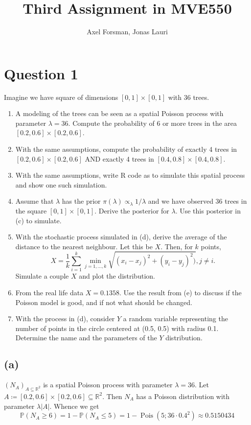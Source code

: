 \documentclass{article}
\title{Third Assignment in MVE550}
\author{Axel Forsman, Jonas Lauri}
\DeclareMathOperator\Poisson{Pois}
\begin{document}
\maketitle

\section{Question 1}
Imagine we have square of dimensions $[0,1] \times [0,1]$ with 36 trees.
\begin{enumerate}[label=(\alph*)]
	\item A modeling of the trees can be seen as a spatial Poisson process with parameter $\lambda = 36$. Compute the probability of 6 or more trees in the area $[0.2, 0.6] \times [0.2, 0.6]$.
	\item With the same assumptions, compute the probability of exactly 4 trees in $[0.2, 0.6] \times [0.2, 0.6]$ AND exactly 4 trees in $[0.4, 0.8] \times [0.4, 0.8]$.
	\item With the same assumptions, write R code as to simulate this spatial process and show one such simulation.
	\item Assume that $\lambda$ has the prior $\pi(\lambda) \propto_\lambda 1/\lambda$ and we have observed 36 trees in the square $[0,1] \times [0,1]$. Derive the posterior for $\lambda$. Use this posterior in (c) to simulate.
	\item With the stochastic process simulated in (d), derive the average of the distance to the nearest neighbour. Let this be $X$. Then, for $k$ points,
	$$X = \frac{1}{k}\sum_{i=1}^k \min_{j = 1, ..., k} \sqrt{(x_i-x_j)^2+(y_i-y_j)^2)}, j \neq i.$$
	Simulate a couple $X$ and plot the distribution.
	\item From the real life data $X = 0.1358$. Use the result from (e) to discuss if the Poisson model is good, and if not what should be changed.
	\item With the process in (d), consider $Y$ a random variable representing the number of points in the circle centered at (0.5, 0.5) with radius 0.1. Determine the name and the parameters of the $Y$ distribution.
\end{enumerate}

\subsection{(a)}
$(N_A)_{A \subseteq \mathbb R^2}$ is a spatial Poisson process
with parameter $\lambda = 36$.
Let $A \coloneqq [0.2, 0.6] \times [0.2, 0.6] \subseteq \mathbb R^2$.
Then $N_A$ has a Poisson distribution with parameter $\lambda \lvert A \rvert$.
Whence we get
$$ \mathbb P(N_A \ge 6) = 1 - \mathbb P(N_A \le 5) = 1 - \Poisson(5; 36 \cdot 0.4^2)
\approx \num{0.5150434} $$
\end{document}
